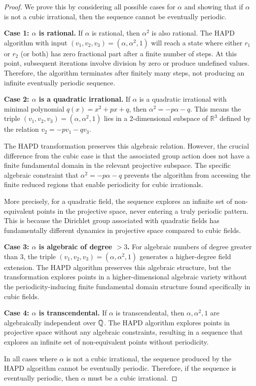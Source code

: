 \begin{proof}
We prove this by considering all possible cases for $\alpha$ and showing that if $\alpha$ is not a cubic irrational, then the sequence cannot be eventually periodic.

\textbf{Case 1: $\alpha$ is rational.} If $\alpha$ is rational, then $\alpha^2$ is also rational. The HAPD algorithm with input $(v_1, v_2, v_3) = (\alpha, \alpha^2, 1)$ will reach a state where either $r_1$ or $r_2$ (or both) has zero fractional part after a finite number of steps. At this point, subsequent iterations involve division by zero or produce undefined values. Therefore, the algorithm terminates after finitely many steps, not producing an infinite eventually periodic sequence.

\textbf{Case 2: $\alpha$ is a quadratic irrational.} If $\alpha$ is a quadratic irrational with minimal polynomial $q(x) = x^2 + px + q$, then $\alpha^2 = -p\alpha - q$. This means the triple $(v_1, v_2, v_3) = (\alpha, \alpha^2, 1)$ lies in a 2-dimensional subspace of $\mathbb{R}^3$ defined by the relation $v_2 = -pv_1 - qv_3$.

The HAPD transformation preserves this algebraic relation. However, the crucial difference from the cubic case is that the associated group action does not have a finite fundamental domain in the relevant projective subspace. The specific algebraic constraint that $\alpha^2 = -p\alpha - q$ prevents the algorithm from accessing the finite reduced regions that enable periodicity for cubic irrationals.

More precisely, for a quadratic field, the sequence explores an infinite set of non-equivalent points in the projective space, never entering a truly periodic pattern. This is because the Dirichlet group associated with quadratic fields has fundamentally different dynamics in projective space compared to cubic fields.

\textbf{Case 3: $\alpha$ is algebraic of degree $> 3$.} For algebraic numbers of degree greater than 3, the triple $(v_1, v_2, v_3) = (\alpha, \alpha^2, 1)$ generates a higher-degree field extension. The HAPD algorithm preserves this algebraic structure, but the transformation explores points in a higher-dimensional algebraic variety without the periodicity-inducing finite fundamental domain structure found specifically in cubic fields.

\textbf{Case 4: $\alpha$ is transcendental.} If $\alpha$ is transcendental, then $\alpha, \alpha^2, 1$ are algebraically independent over $\mathbb{Q}$. The HAPD algorithm explores points in projective space without any algebraic constraints, resulting in a sequence that explores an infinite set of non-equivalent points without periodicity.

In all cases where $\alpha$ is not a cubic irrational, the sequence produced by the HAPD algorithm cannot be eventually periodic. Therefore, if the sequence is eventually periodic, then $\alpha$ must be a cubic irrational.
\end{proof}

